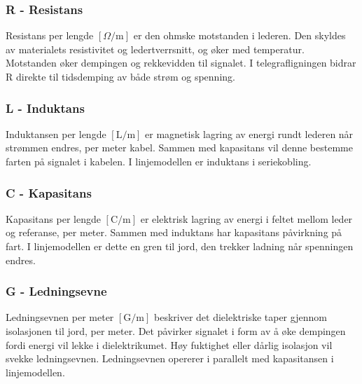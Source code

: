 \subsubsection{R - Resistans}
Resistans per lengde $[\Omega/\mathrm{m}]$ er den ohmske motstanden i lederen. Den skyldes av materialets resistivitet og ledertverrsnitt, og øker med temperatur. Motstanden øker dempingen og rekkevidden til signalet. I telegrafligningen bidrar R direkte til tidsdemping av både strøm og spenning.

\subsubsection{L - Induktans}
Induktansen per lengde $[\mathrm{L}/\mathrm{m}]$ er magnetisk lagring av energi rundt lederen når strømmen endres, per meter kabel. Sammen med kapasitans vil denne bestemme farten på signalet i kabelen. I linjemodellen er induktans i seriekobling.

\subsubsection{C - Kapasitans}
Kapasitans per lengde $[\mathrm{C}/\mathrm{m}]$ er elektrisk lagring av energi i feltet mellom leder og referanse, per meter. Sammen med induktans har kapasitans påvirkning på fart. I linjemodellen er dette en gren til jord, den trekker ladning når spenningen endres.

\subsubsection{G - Ledningsevne}
Ledningsevnen per meter $[\mathrm{G}/\mathrm{m}]$ beskriver det dielektriske taper gjennom isolasjonen til jord, per meter. Det påvirker signalet i form av å øke dempingen fordi energi vil lekke i dielektrikumet. Høy fuktighet eller dårlig isolasjon vil svekke ledningsevnen. Ledningsevnen opererer i parallelt med kapasitansen i linjemodellen.









